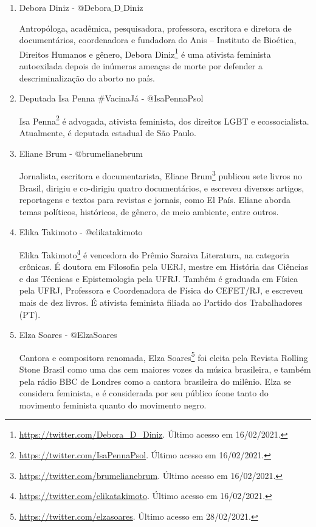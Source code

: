 \documentclass[
	12pt,				%
	openright,			%
	twoside,			%
	a4paper,			%
	english,			%
	brazil				%
	]{abntex2}
\begin{document}
\begin{anexosenv}
\begin{enumerate}
 \item Debora Diniz - @Debora$\_$D$\_$Diniz
 
 Antropóloga, acadêmica, pesquisadora, professora, escritora e diretora de documentários, coordenadora e fundadora do Anis -- Instituto de Bioética, Direitos Humanos e gênero, Debora Diniz\footnote{\url{https://twitter.com/Debora_D_Diniz}. Último acesso em 16/02/2021.} é uma ativista feminista autoexilada depois de inúmeras ameaças de morte por defender a descriminalização do aborto no país.

 \item Deputada Isa Penna $\#$VacinaJá - @IsaPennaPsol
 
 Isa Penna\footnote{\url{https://twitter.com/IsaPennaPsol}. Último acesso em 16/02/2021.} é advogada, ativista feminista, dos direitos LGBT e ecossocialista. Atualmente, é deputada estadual de São Paulo.

 \item Eliane Brum - @brumelianebrum
 
 Jornalista, escritora e documentarista, Eliane Brum\footnote{\url{https://twitter.com/brumelianebrum}. Último acesso em 16/02/2021.} publicou sete livros no Brasil, dirigiu e co-dirigiu quatro documentários, e escreveu diversos artigos, reportagens e textos para revistas e jornais, como El País. Eliane aborda temas políticos, históricos, de gênero, de meio ambiente, entre outros.

 \item Elika Takimoto - @elikatakimoto
 
 Elika Takimoto\footnote{\url{https://twitter.com/elikatakimoto}. Último acesso em 16/02/2021.} é vencedora do Prêmio Saraiva Literatura, na categoria crônicas. É doutora em Filosofia pela UERJ, mestre em História das Ciências e das Técnicas e Epistemologia pela UFRJ. Também é graduada em Física pela UFRJ, Professora e Coordenadora de Física do CEFET/RJ, e escreveu mais de dez livros. É ativista feminista filiada ao Partido dos Trabalhadores (PT).
\newpage
 \item Elza Soares - @ElzaSoares
 
 Cantora e compositora renomada, Elza Soares\footnote{\url{https://twitter.com/elzasoares}. Último acesso em 28/02/2021.} foi eleita pela Revista Rolling Stone Brasil como uma das cem maiores vozes da música brasileira, e também pela rádio BBC de Londres como a cantora brasileira do milênio. Elza se considera feminista, e é considerada por seu público ícone tanto do movimento feminista quanto do movimento negro.


\end{enumerate}
\end{anexosenv}
\end{document}
